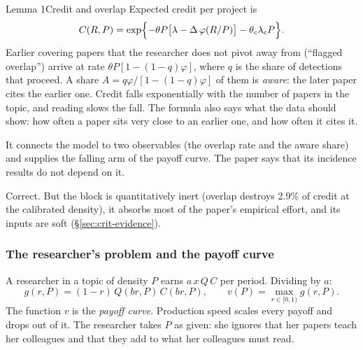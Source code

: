 \begin{resultbox}{Lemma 1}{Credit and overlap}{\tminor}
Expected credit per project is
\[
C(R,P)=\exp\Bigl\{-\theta P\bigl[\lambda-\Delta\,\varphi(R/P)\bigr]-\theta_c\lambda_cP\Bigr\}.
\]
Earlier covering papers that the researcher does not pivot away from (``flagged overlap'') arrive at rate $\theta P[1-(1-q)\varphi]$, where $q$ is the share of detections that proceed. A share $A=q\varphi/[1-(1-q)\varphi]$ of them is \emph{aware}: the later paper cites the earlier one.
\tcblower
\inwords Credit falls exponentially with the number of papers in the topic, and reading slows the fall. The formula also says what the data should show: how often a paper sits very close to an earlier one, and how often it cites it.

\role It connects the model to two observables (the overlap rate and the aware share) and supplies the falling arm of the payoff curve. The paper says that its incidence results do not depend on it.

\review Correct. But the block is quantitatively inert (overlap destroys 2.9\% of credit at the calibrated density), it absorbs most of the paper's empirical effort, and its inputs are soft (\S\ref{sec:crit-evidence}).
\end{resultbox}

\subsubsection{The researcher's problem and the payoff curve}
A researcher in a topic of density $P$ earns $a\,x\,Q\,C$ per period. Dividing by $a$:
\[
g(r,P)=(1-r)\,Q(br,P)\,C(br,P),\qquad v(P)=\max_{r\in[0,1)} g(r,P).
\]
The function $v$ is the \emph{payoff curve}. Production speed scales every payoff and drops out of it. The researcher takes $P$ as given: she ignores that her papers teach her colleagues and that they add to what her colleagues must read.

